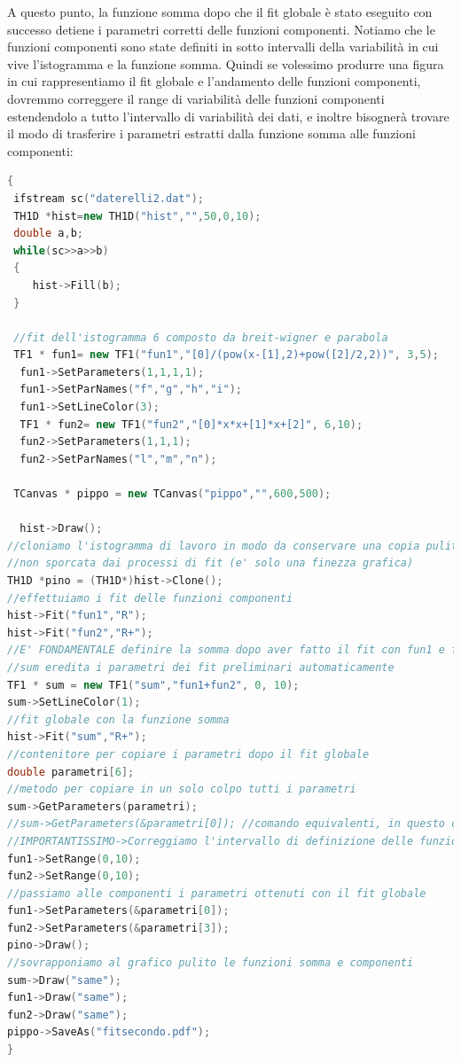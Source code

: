 \documentclass[11pt,fleqn]{book} %
\begin{document}
A questo punto, la funzione somma dopo che il fit globale è stato eseguito con successo detiene i parametri corretti delle funzioni componenti. Notiamo che le funzioni componenti sono state definiti in sotto intervalli della variabilità in cui vive l'istogramma e la funzione somma. Quindi se volessimo produrre una figura in cui rappresentiamo il fit globale e l'andamento delle funzioni componenti, dovremmo correggere il range di variabilità delle funzioni componenti estendendolo a tutto l'intervallo di variabilità dei dati, e inoltre bisognerà trovare il modo di trasferire i parametri estratti dalla funzione somma alle funzioni componenti:
\begin{lstlisting}[language=c++]
{
 ifstream sc("daterelli2.dat");
 TH1D *hist=new TH1D("hist","",50,0,10);
 double a,b;
 while(sc>>a>>b)
 {
	hist->Fill(b);
 }

 //fit dell'istogramma 6 composto da breit-wigner e parabola
 TF1 * fun1= new TF1("fun1","[0]/(pow(x-[1],2)+pow([2]/2,2))", 3,5);      //((x-[2])*(x-[3])+[1]/4)[0]) altra forma della breit
  fun1->SetParameters(1,1,1,1);
  fun1->SetParNames("f","g","h","i");
  fun1->SetLineColor(3);
  TF1 * fun2= new TF1("fun2","[0]*x*x+[1]*x+[2]", 6,10);
  fun2->SetParameters(1,1,1);
  fun2->SetParNames("l","m","n");

 TCanvas * pippo = new TCanvas("pippo","",600,500);

  hist->Draw();
//cloniamo l'istogramma di lavoro in modo da conservare una copia pulita
//non sporcata dai processi di fit (e' solo una finezza grafica)
TH1D *pino = (TH1D*)hist->Clone();
//effettuiamo i fit delle funzioni componenti
hist->Fit("fun1","R");
hist->Fit("fun2","R+");
//E' FONDAMENTALE definire la somma dopo aver fatto il fit con fun1 e fun2
//sum eredita i parametri dei fit preliminari automaticamente
TF1 * sum = new TF1("sum","fun1+fun2", 0, 10);
sum->SetLineColor(1);
//fit globale con la funzione somma
hist->Fit("sum","R+");
//contenitore per copiare i parametri dopo il fit globale
double parametri[6];
//metodo per copiare in un solo colpo tutti i parametri
sum->GetParameters(parametri);
//sum->GetParameters(&parametri[0]); //comando equivalenti, in questo caso specifichiamo da quale elemento deve partire a copiare
//IMPORTANTISSIMO->Correggiamo l'intervallo di definizione delle funzioni componenti
fun1->SetRange(0,10);
fun2->SetRange(0,10);
//passiamo alle componenti i parametri ottenuti con il fit globale
fun1->SetParameters(&parametri[0]);
fun2->SetParameters(&parametri[3]);
pino->Draw();
//sovrapponiamo al grafico pulito le funzioni somma e componenti
sum->Draw("same");
fun1->Draw("same");
fun2->Draw("same");
pippo->SaveAs("fitsecondo.pdf");
}
\end{lstlisting}
\end{document}
